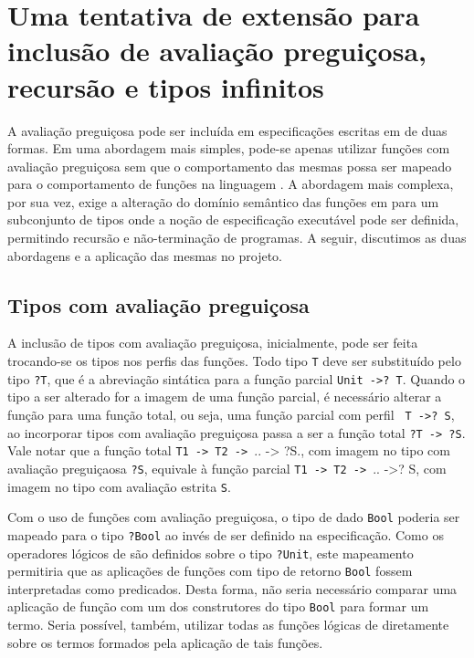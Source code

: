\chapter{Uma tentativa de extensão para inclusão de avaliação preguiçosa, recursão e tipos infinitos}
\label{chap:laziness}

A avaliação preguiçosa pode ser incluída em especificações escritas em \HasCASL de duas formas.
Em uma abordagem mais simples, pode-se apenas utilizar funções com avaliação preguiçosa sem que o comportamento das mesmas possa ser mapeado para o comportamento de funções na linguagem \Haskell.
A abordagem mais complexa, por sua vez, exige a alteração do domínio semântico das funções em \HasCASL para um subconjunto de tipos onde a noção de especificação executável pode ser definida, permitindo recursão e não-terminação de programas.
A seguir, discutimos as duas abordagens e a aplicação das mesmas no projeto.

\section{Tipos com avaliação preguiçosa}
A inclusão de tipos com avaliação preguiçosa, inicialmente, pode ser feita trocando-se os tipos nos perfis das funções.
Todo tipo \Verb.T. deve ser substituído pelo tipo \Verb.?T., que é a abreviação sintática para a função parcial \Verb.Unit ->? T..
Quando o tipo a ser alterado for a imagem de uma função parcial, é necessário alterar a função para uma função total, ou seja, uma função parcial com perfil \Verb. T ->? S., ao incorporar tipos com avaliação preguiçosa passa a ser a função total \Verb.?T -> ?S..
Vale notar que a função total \Verb.T1 -> T2 -> ... -> ?S., com imagem no tipo com avaliação preguiçaosa \Verb.?S., equivale à função parcial \Verb.T1 -> T2 -> ... ->? S, com imagem no tipo com avaliação estrita \Verb.S..

Com o uso de funções com avaliação preguiçosa, o tipo de dado \Verb.Bool. poderia ser mapeado para o tipo \Verb.?Bool. ao invés de ser definido na especificação.
Como os operadores lógicos de \HasCASL são definidos sobre o tipo \Verb.?Unit., este mapeamento permitiria que as aplicações de funções com tipo de retorno \Verb.Bool. fossem interpretadas como predicados.
Desta forma, não seria necessário comparar uma aplicação de função com um dos construtores do tipo \Verb.Bool. para formar um termo.
Seria possível, também, utilizar todas as funções lógicas de \HasCASL diretamente sobre os termos formados pela aplicação de tais funções.

